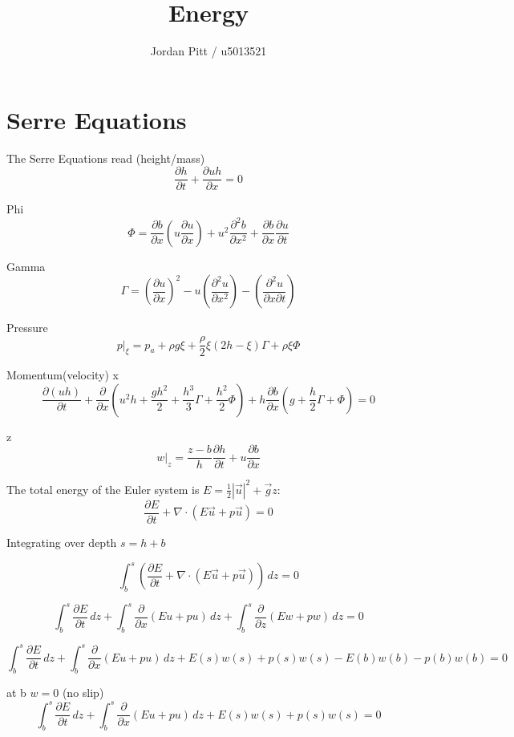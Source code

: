 \documentclass[12pt]{article}
\begin{document}
\title{Energy}
\author{Jordan Pitt / u5013521}

\section{Serre Equations}

The Serre Equations read
(height/mass)
\[\frac{\partial h}{\partial t} + \frac{\partial uh}{\partial x} = 0 \]

Phi
\[\Phi = \frac{\partial b}{\partial x}\left(u \frac{\partial u}{\partial x}\right) + u^2 \frac{\partial^2 b}{\partial x^2} + \frac{\partial b}{\partial x}\frac{\partial u}{\partial t}\]

Gamma
\[\Gamma = \left(\frac{\partial u}{\partial x} \right)^2 - u \left(\frac{\partial^2 u}{\partial x^2} \right) - \left(\frac{\partial^2 u}{\partial x \partial t} \right)\]

Pressure
\[p|_\xi = p_a + \rho g \xi + \frac{\rho}{2}\xi\left(2h - \xi\right)\Gamma + \rho \xi \Phi \]


Momentum(velocity)
x
\[ \frac{\partial (uh)}{\partial t} + \frac{\partial}{\partial x}\left(u^2 h + \frac{gh^2}{2} + \frac{h^3}{3}\Gamma + \frac{h^2}{2} \Phi\right) + h \frac{\partial b}{\partial x}\left(g + \frac{h}{2}\Gamma + \Phi\right) = 0\]

z
\[w|_z = \frac{z - b}{h} \frac{\partial h}{\partial t} + u \frac{\partial b}{\partial x}\]

The total energy of the Euler system is $E = \frac{1}{2} |\vec{u}|^2 + \vec{g}z$:
\[\frac{\partial E}{\partial t} + \nabla \cdot \left(E\vec{u} + p\vec{u}\right) = 0\]

Integrating over depth $s = h + b$

\[ \int_b^s \left(\frac{\partial E}{\partial t} + \nabla \cdot \left(E\vec{u} + p\vec{u}\right)\right) \, dz =0\]

\[ \int_b^s \frac{\partial E}{\partial t} \, dz +  \int_b^s\frac{\partial}{\partial x} \left(Eu + pu\right) \, dz  +  \int_b^s\frac{\partial}{\partial z} \left(Ew + pw\right) \, dz =0\]

\[ \int_b^s \frac{\partial E}{\partial t} \, dz +  \int_b^s\frac{\partial}{\partial x} \left(Eu + pu\right) \, dz +  E(s)w(s) + p(s)w(s) - E(b)w(b) - p(b)w(b)  =0 \]

at b $w = 0$ (no slip) \\

\[ \int_b^{s} \frac{\partial E}{\partial t} \, dz +  \int_b^{s}\frac{\partial}{\partial x} \left(Eu + pu\right) \, dz +  E(s)w(s) + p(s)w(s) = 0\]
\end{document}
